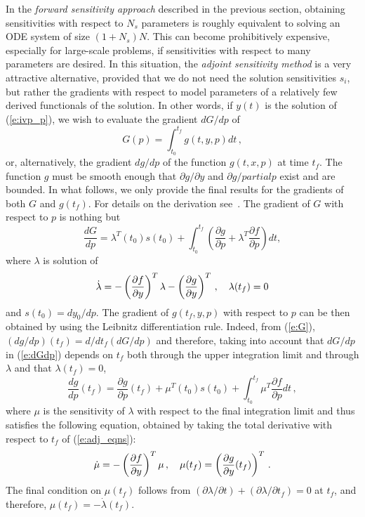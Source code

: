 In the {\em forward sensitivity approach} described in the previous
section, obtaining sensitivities with respect to $N_s$ parameters is roughly
equivalent to solving an ODE system of size $(1+N_s) N$. This can become 
prohibitively expensive, especially for large-scale problems, if sensitivities
with respect to many parameters are desired.
In this situation, the {\em adjoint sensitivity method} is a very
attractive alternative, provided that we do not need the solution sensitivities
$s_i$, but rather the gradients with respect to model parameters of a relatively 
few derived functionals of the solution. In other words, if $y(t)$ is the solution
of (\ref{e:ivp_p}), we wish to evaluate the gradient ${dG}/{dp}$ of
\begin{equation}\label{e:G}
G(p) = \int_{t_0}^{t_f} g(t, y, p) dt \, ,
\end{equation}
or, alternatively, the gradient ${dg}/{dp}$ of the function $g(t, x, p)$ 
at time $t_f$. The function $g$ must be smooth enough that $\partial g / \partial y$ 
and $\partial g / partial p$ exist and are bounded. 
In what follows, we only provide the final results for the gradients of both $G$ and 
$g(t_f)$. For details on the derivation see~\cite{CLPS:03}.
%
The gradient of $G$ with respect to $p$ is nothing but
\begin{equation}\label{e:dGdp}
  \frac{dG}{dp} = \lambda^T(t_0) s(t_0) + 
  \int_{t_0}^{t_f} \left( \frac{\partial g}{\partial p} + 
    \lambda^T \frac{\partial f}{\partial p} \right) dt,
\end{equation}
where $\lambda$ is solution of
\begin{equation}\label{e:adj_eqns}
{\dot \lambda} = -\left( \frac{\partial f}{\partial y} \right)^T \lambda - 
\left( \frac{\partial g}{\partial y} \right)^T \, ,
\quad \lambda(t_f) = 0
\end{equation}
and $s(t_0) = dy_0/dp$.
%
The gradient of $g(t_f,y,p)$ with respect to $p$ can be then obtained
by using the Leibnitz differentiation rule. Indeed, from (\ref{e:G}),
$({dg}/{dp})(t_f) = {d}/{dt_f}({dG}/{dp})$
and therefore, taking into account that $dG/dp$ in (\ref{e:dGdp}) depends on $t_f$
both through the upper integration limit and through $\lambda$ and that $\lambda(t_f) = 0$, 
\begin{equation}\label{e:dgdp}
  \frac{dg}{dp}(t_f) = 
  \frac{\partial g}{\partial p}(t_f) +
  \mu^T(t_0) s(t_0) + 
  \int_{t_0}^{t_f} \mu^T \frac{\partial f}{\partial p} dt \, ,
\end{equation}
where $\mu$ is the sensitivity of $\lambda$ with respect to the final integration 
limit and thus satisfies the following equation, obtained by taking the total derivative
with respect to $t_f$ of (\ref{e:adj_eqns}):
\begin{equation}\label{e:adj1_eqns}
{\dot \mu} = -\left( \frac{\partial f}{\partial y} \right)^T \mu \, ,
\quad \mu(t_f) = \left( \frac{\partial g}{\partial y}(t_f) \right)^T \, .
\end{equation}
The final condition on $\mu(t_f)$ follows from 
$(\partial\lambda/\partial t) + (\partial\lambda/\partial t_f) = 0$ at $t_f$, and
therefore, $\mu(t_f) = -{\dot\lambda}(t_f)$. 

